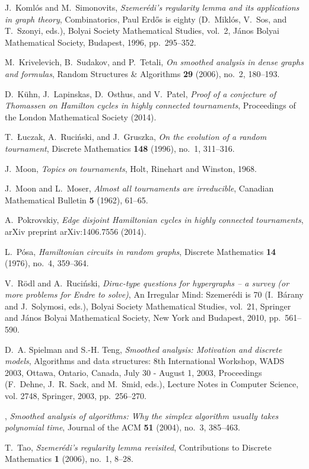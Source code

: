 \documentclass[11pt,english]{article}
\theoremstyle{plain}
\theoremstyle{definition}
\theoremstyle{definition}
\theoremstyle{plain}
\theoremstyle{plain}
\theoremstyle{plain}
\theoremstyle{plain}
\theoremstyle{remark}
\theoremstyle{remark}
\begin{document}
\begin{thebibliography}{10}
J.~Koml\'os and M.~Simonovits, \emph{Szemer\'edi's regularity lemma and its
  applications in graph theory}, Combinatorics, {P}aul {E}rd\H{o}s is eighty
  (D.~Mikl\'os, V.~Sos, and T.~Szonyi, eds.), Bolyai Society Mathematical
  Studies, vol.~2, J\'anos {B}olyai Mathematical Society, Budapest, 1996,
  pp.~295--352.

M.~Krivelevich, B.~Sudakov, and P.~Tetali, \emph{On smoothed analysis in dense
  graphs and formulas}, Random Structures \& Algorithms \textbf{29} (2006),
  no.~2, 180--193.

D.~K{\"u}hn, J.~Lapinskas, D.~Osthus, and V.~Patel, \emph{Proof of a conjecture
  of {T}homassen on {H}amilton cycles in highly connected tournaments},
  Proceedings of the London Mathematical Society (2014).

T.~{\L}uczak, A.~Ruci{\'n}ski, and J.~Gruszka, \emph{On the evolution of a
  random tournament}, Discrete Mathematics \textbf{148} (1996), no.~1,
  311--316.

J.~Moon, \emph{Topics on tournaments}, Holt, Rinehart and Winston, 1968.

J.~Moon and L.~Moser, \emph{Almost all tournaments are irreducible}, Canadian
  Mathematical Bulletin \textbf{5} (1962), 61--65.

A.~Pokrovskiy, \emph{Edge disjoint {H}amiltonian cycles in highly connected
  tournaments}, arXiv preprint arXiv:1406.7556 (2014).

L.~P{\'o}sa, \emph{{H}amiltonian circuits in random graphs}, Discrete
  Mathematics \textbf{14} (1976), no.~4, 359--364.

V.~R{\"o}dl and A.~Ruci{\'n}ski, \emph{Dirac-type questions for hypergraphs --
  a survey (or more problems for {E}ndre to solve)}, An Irregular Mind:
  Szemer\'edi is 70 (I.~B\'arany and J.~Solymosi, eds.), Bolyai Society
  Mathematical Studies, vol.~21, Springer and J\'anos Bolyai Mathematical
  Society, New York and Budapest, 2010, pp.~561--590.

D.~A. Spielman and S.-H. Teng, \emph{Smoothed analysis: Motivation and discrete
  models}, Algorithms and data structures: 8th International Workshop, WADS
  2003, Ottawa, Ontario, Canada, July 30 - August 1, 2003, Proceedings
  (F.~Dehne, J.~R. Sack, and M.~Smid, eds.), Lecture Notes in Computer Science,
  vol. 2748, Springer, 2003, pp.~256--270.

\bysame, \emph{Smoothed analysis of algorithms: Why the simplex algorithm
  usually takes polynomial time}, Journal of the ACM \textbf{51} (2004), no.~3,
  385--463.

T.~Tao, \emph{Szemer\'edi's regularity lemma revisited}, Contributions to
  Discrete Mathematics \textbf{1} (2006), no.~1, 8--28.

\end{thebibliography}
\end{document}

